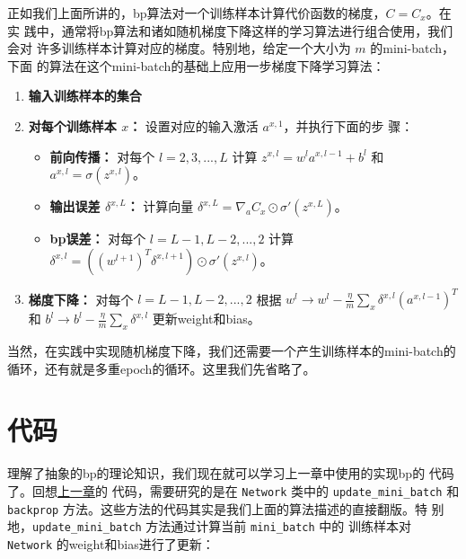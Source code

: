 正如我们上面所讲的，\gls*{bp}算法对一个训练样本计算代价函数的梯度，$C=C_x$。在实
践中，通常将\gls*{bp}算法和诸如随机梯度下降这样的学习算法进行组合使用，我们会对
许多训练样本计算对应的梯度。特别地，给定一个大小为 $m$ 的\gls*{mini-batch}，下面
的算法在这个\gls*{mini-batch}的基础上应用一步梯度下降学习算法：

\begin{enumerate}
\item \textbf{输入训练样本的集合}
\item \textbf{对每个训练样本 $x$：} 设置对应的输入激活 $a^{x,1}$，并执行下面的步
  骤：
  \begin{itemize}
  \item \textbf{前向传播：} 对每个 $l=2,3,...,L$ 计算 $z^{x,l} = w^la^{x,l-1} +
    b^l$ 和 $a^{x,l} = \sigma(z^{x,l})$。
  \item \textbf{输出误差 $\delta^{x,L}$：} 计算向量
    $\delta^{x,L} = \nabla_a C_x \odot \sigma'(z^{x,L})$。
  \item \textbf{\gls*{bp}误差：} 对每个 $l=L-1, L-2, ..., 2$ 计算
    $\delta^{x,l} = ((w^{l+1})^T\delta^{x,l+1})\odot \sigma'(z^{x,l})$。
  \end{itemize}
\item \textbf{梯度下降：} 对每个 $l=L-1, L-2, ..., 2$ 根据 $w^l \rightarrow w^l
  - \frac{\eta}{m}\sum_x \delta^{x,l}(a^{x,l-1})^T$ 和 $b^l \rightarrow b^l -
  \frac{\eta}{m}\sum_x \delta^{x,l}$ 更新\gls*{weight}和\gls*{bias}。
\end{enumerate}

当然，在实践中实现随机梯度下降，我们还需要一个产生训练样本的\gls*{mini-batch}的
循环，还有就是多重\gls*{epoch}的循环。这里我们先省略了。

\section{代码}
\label{sec:the_code_for_backpropagation}

理解了抽象的\gls*{bp}的理论知识，我们现在就可以学习上一章中使用的实现\gls*{bp}的
代码了。回想\hyperref[sec:implementing_our_network_to_classify_digits]{上一章}的
代码，需要研究的是在 \lstinline!Network! 类中的 \lstinline!update_mini_batch! 和
\lstinline!backprop! 方法。这些方法的代码其实是我们上面的算法描述的直接翻版。特
别地，\lstinline!update_mini_batch! 方法通过计算当前 \lstinline!mini_batch! 中的
训练样本对 \lstinline!Network! 的\gls*{weight}和\gls*{bias}进行了更新：

